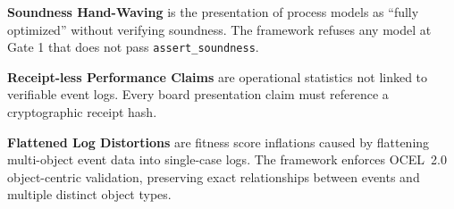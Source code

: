 \textbf{Soundness Hand-Waving} is the presentation of process models as ``fully optimized''
without verifying soundness. The framework refuses any model at Gate 1 that does not
pass \texttt{assert\_soundness}.

\textbf{Receipt-less Performance Claims} are operational statistics not linked to
verifiable event logs. Every board presentation claim must reference a cryptographic
receipt hash.

\textbf{Flattened Log Distortions} are fitness score inflations caused by flattening
multi-object event data into single-case logs. The framework enforces OCEL~2.0
object-centric validation, preserving exact relationships between events and multiple
distinct object types.
